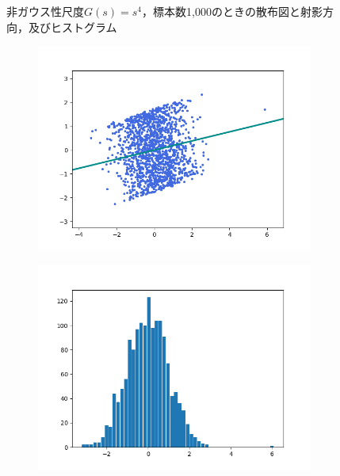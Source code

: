 \documentclass[class=jsarticle, crop=false, dvipdfmx, fleqn]{standalone}
\begin{document}
\begin{figure}
\begin{minipage}{0.45\linewidth}
\begin{figure}[H]
            \label{fig:s4_n1000_hist}
        \end{figure}
    \end{minipage}
    \caption{非ガウス性尺度\(G(s) = s^4\)，標本数1,000のときの散布図と射影方向，及びヒストグラム}
    \label{fig:s4_n1000}
\end{figure}

\begin{figure}
	\centering
    \begin{minipage}{0.45\linewidth}
        \begin{figure}[H]
        	   \centering
            \includegraphics[clip, width=\linewidth]{../figures/assignment2_result_s4_n1500_scatter.png}
            \label{fig:s4_n1500_scatter}
        \end{figure}
    \end{minipage}
    \begin{minipage}{0.45\linewidth}
        \begin{figure}[H]
            \centering
            \includegraphics[clip, width=\linewidth]{../figures/assignment2_result_s4_n1500_hist.png}

\end{figure}
\end{minipage}
\end{figure}
\end{document}
